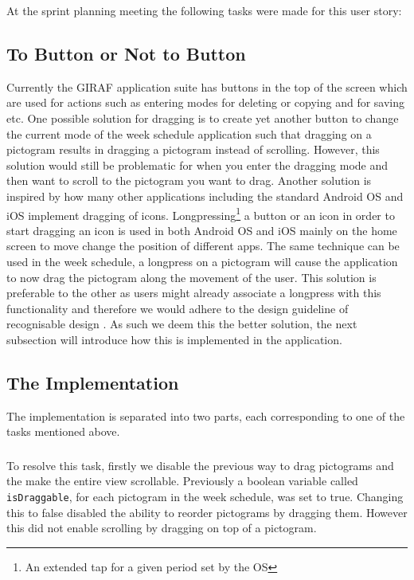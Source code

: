 \bigskip \noindent
At the sprint planning meeting the following tasks were made for this user story:
\begin{enumberate}
	\item {}
	\item {}
\end{enumberate}

\subsection*{To Button or Not to Button} %
Currently the GIRAF application suite has buttons in the top of the screen which are used for actions such as entering modes for deleting or copying and for saving etc. 
One possible solution for dragging is to create yet another button to change the current mode of the week schedule application such that dragging on a pictogram results in dragging a pictogram instead of scrolling.
However, this solution would still be problematic for when you enter the dragging mode and then want to scroll to the pictogram you want to drag.
Another solution is inspired by how many other applications including the standard Android OS and iOS implement dragging of icons.
Longpressing\footnote{An extended tap for a given period set by the OS} a button or an icon in order to start dragging an icon is used in both Android OS and iOS mainly on the home screen to move change the position of different apps.
The same technique can be used in the week schedule, a longpress on a pictogram will cause the application to now drag the pictogram along the movement of the user.
This solution is preferable to the other as users might already associate a longpress with this functionality and therefore we would adhere to the design guideline of recognisable design \cite[p.~51]{DESIGNBOOK}.
As such we deem this the better solution, the next subsection will introduce how this is implemented in the application.

\subsection*{The Implementation}
The implementation is separated into two parts, each corresponding to one of the tasks mentioned above. 
\subsubsection*{}
To resolve this task, firstly we disable the previous way to drag pictograms and the make the entire view scrollable. 
Previously a boolean variable called \texttt{isDraggable}, for each pictogram in the week schedule, was set to true. 
Changing this to false disabled the ability to reorder pictograms by dragging them. 
However this did not enable scrolling by dragging on top of a pictogram. 

